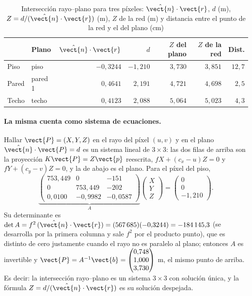 \begin{table}[htbp]
\caption{Intersección rayo--plano para tres píxeles: $\hat{\vect{n}}\cdot\vect{r}$, $d$ (m), $Z=d/(\hat{\vect{n}}\cdot\vect{r})$ (m), $Z$ de la red (m) y distancia entre el punto de la red y el del plano (cm)}
\label{tab:hab-int}
\centering\small
\begin{tabular}{@{}llrrrrr@{}}
\toprule
 & Plano & $\hat{\vect{n}}\cdot\vect{r}$ & $d$ & $Z$ del plano & $Z$ de la red & Dist. \\
\midrule
Piso & piso & $-0{,}3244$ & $-1{,}210$ & $3{,}730$ & $3{,}851$ & $12{,}7$ \\
Pared & pared 1 & $0{,}4641$ & $2{,}191$ & $4{,}721$ & $4{,}698$ & $2{,}5$ \\
Techo & techo & $0{,}4123$ & $2{,}088$ & $5{,}064$ & $5{,}023$ & $4{,}3$ \\
\bottomrule
\end{tabular}
\end{table}

\paragraph{La misma cuenta como sistema de ecuaciones.} Hallar $\vect{P}=(X,Y,Z)$ en el rayo del píxel $(u,v)$ y en el plano $\hat{\vect{n}}\cdot\vect{P}=d$ es
un sistema lineal de $3\times3$: las dos filas de arriba son la proyección $K\vect{P}=Z\vect{p}$ reescrita, $fX+(c_x-u)Z=0$ y $fY+(c_y-v)Z=0$, y la de abajo es el plano.
Para el píxel del piso,
\begin{equation}
\underbrace{\begin{pmatrix}753{,}449&0&-151\\0&753{,}449&-202\\0{,}0100&-0{,}9982&-0{,}0587\end{pmatrix}}_{A}
\begin{pmatrix}X\\Y\\Z\end{pmatrix}=\begin{pmatrix}0\\0\\-1{,}210\end{pmatrix}.
\end{equation}
Su determinante es $\det A=f^{2}\,(\hat{\vect{n}}\cdot\vect{r})=(567\,685)(-0{,}3244)=-184\,145{,}3$ (se desarrolla por la primera columna y sale $f^2$ por el producto punto), que es distinto de
cero justamente cuando el rayo no es paralelo al plano; entonces $A$ es invertible y $\vect{P}=A^{-1}\vect{b}=\begin{pmatrix} 0{,}748 \\ 1{,}000 \\ 3{,}730 \end{pmatrix}$ m, el mismo punto de arriba. Es decir: la intersección
rayo--plano es un sistema $3\times3$ con solución única, y la fórmula $Z=d/(\hat{\vect{n}}\cdot\vect{r})$ es su solución despejada.

